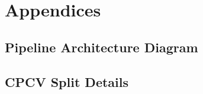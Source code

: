 \documentclass[12pt,a4paper,oneside]{article}
\begin{document}
%



\newpage
{}
\thispagestyle{plain}

\nocite{*}



\newpage
{}
\thispagestyle{plain}

\appendix
\section{Appendices}\label{sec:appendices}

\subsection{Pipeline Architecture Diagram}\label{app:pipeline}

\subsection{CPCV Split Details}\label{app:cpcv_splits}
\end{document}

